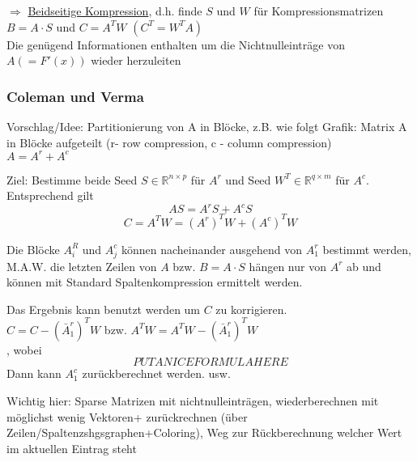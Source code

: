 $\Rightarrow$ \underline{Beidseitige Kompression}, d.h. finde $S$ und $W$ für Kompressionsmatrizen\\
$B=A\cdot S$ und $C=A^TW$ $(C^T = W^T A)$\\
Die genügend Informationen enthalten um die Nichtnulleinträge von $A (=F'(x))$ wieder herzuleiten

\subsubsection{Coleman und Verma}
\label{subsubsec:part_row/column_compr}
Vorschlag/Idee:
Partitionierung von A in Blöcke, z.B. wie folgt
Grafik: Matrix A in Blöcke aufgeteilt (r- row compression, c - column compression)\\


$A=A^r+A^c$
\vspace{3cm}

Ziel: Bestimme beide Seed $S \in \mathbb{R}^{n\times p}$ für $A^r$ und Seed $W^T \in \mathbb{R}^{q\times m}$ für $A^c$. Entsprechend gilt\\
$$AS = A^rS + A^cS$$
$$C = A^TW = (A^r)^TW + (A^c)^TW$$

Die Blöcke $A_i^R$ und $A_j^c$ können nacheinander ausgehend von $A_1^r$ bestimmt werden,\\
M.A.W. die letzten Zeilen von $A$ bzw. $B=A\cdot S$ hängen nur von $A^r$ ab und können mit Standard Spaltenkompression ermittelt werden.

Das Ergebnis kann benutzt werden um $C$ zu korrigieren.\\
$C = C- (\bar{A}_1^r)^TW$ bzw. $A^TW = A^TW- (\bar{A}_1^r)^TW$\\,
wobei\\
$$PUT A NICE FORMULA HERE$$
Dann kann $A_1^c$ zurückberechnet werden. usw.

\noindent\makebox[\linewidth]{\rule{\paperwidth}{0.4pt}}

Wichtig hier:
Sparse Matrizen mit nichtnulleinträgen, wiederberechnen mit möglichst wenig Vektoren+ zurückrechnen (über Zeilen/Spaltenzshgsgraphen+Coloring), Weg zur Rückberechnung welcher Wert im aktuellen Eintrag steht

